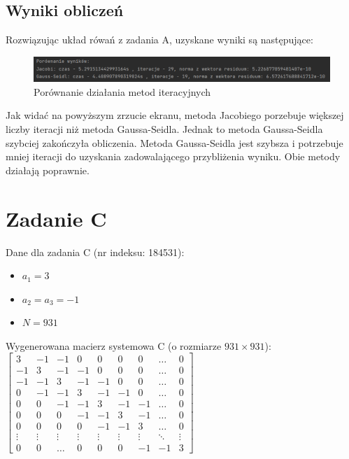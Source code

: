 \documentclass[fleqn]{article}
\begin{document}
    \subsection{Wyniki obliczeń}
    Rozwiązując układ rówań z zadania A, uzyskane wyniki są następujące:

    \begin{figure}[h]

        \centering
        \includegraphics[width=\textwidth]{porownaniGSJac.png}
        \centering
        \caption{Porównanie działania metod iteracyjnych}

    \end{figure}

    Jak widać na powyższym zrzucie ekranu, metoda Jacobiego porzebuje większej liczby iteracji niż metoda Gaussa-Seidla.
    Jednak to metoda Gaussa-Seidla szybciej zakończyła obliczenia. Metoda Gaussa-Seidla jest szybsza i potrzebuje mniej iteracji 
    do uzyskania zadowalającego przybliżenia wyniku. Obie metody działają poprawnie.
    \section{Zadanie C}
    Dane dla zadania C (nr indeksu: 184531):
    \begin{itemize}
        \item $a_1 = 3$ 
        \item $a_2 = a_3 = -1$
        \item $N = 931$
    \end{itemize}

    \noindent Wygenerowana macierz systemowa C (o rozmiarze $931 \times 931$): \\

    $\begin{bmatrix}
    3 & -1 & -1 & 0 & 0 & 0 & 0 & \ldots & 0 \\
    -1 & 3 & -1 & -1 & 0 & 0 & 0 & \ldots & 0 \\
    -1 & -1 & 3 & -1 & -1 & 0 & 0 & \ldots & 0 \\
    0 & -1 & -1 & 3 & -1 & -1 & 0 & \ldots & 0 \\
    0 & 0 & -1 & -1 & 3 & -1 & -1 & \ldots & 0 \\
    0 & 0 & 0 & -1 & -1 & 3 & -1 & \ldots & 0 \\
    0 & 0 & 0 & 0 & -1 & -1 & 3 & \ldots & 0 \\
    \vdots & \vdots & \vdots & \vdots & \vdots & \vdots & \vdots & \ddots & \vdots \\
    0 & 0 & \ldots & 0 & 0 & 0 & -1 & -1 & 3
    \end{bmatrix}$
    \\ 
\end{document}
